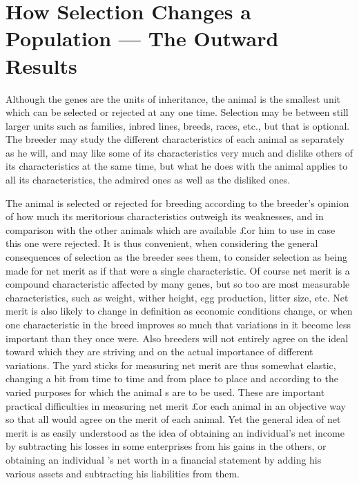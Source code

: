 \chapter[How Selection Changes a Population]{How Selection Changes a Population --- The Outward Results}
\label{cha:how-selection-changes-population-outward-results}

Although the genes are the units of inheritance, the animal is the
smallest unit which can be selected or rejected at any one time. Selection
may be between still larger units such as families, inbred lines,
breeds, races, etc., but that is optional. The breeder may study the different
characteristics of each animal as separately as he will, and may
like some of its characteristics very much and dislike others of its characteristics
at the same time, but what he does with the animal applies to
all its characteristics, the admired ones as well as the disliked ones.

The animal is selected or rejected for breeding according to the
breeder's opinion of how much its meritorious characteristics outweigh
its weaknesses, and in comparison with the other animals which are
available £or him to use in case this one were rejected. It is thus convenient,
when considering the general consequences of selection as the
breeder sees them, to consider selection as being made for net merit as if
that were a single characteristic. Of course net merit is a compound
characteristic affected by many genes, but so too are most measurable
characteristics, such as weight, wither height, egg production, litter
size, etc. Net merit is also likely to change in definition as economic
conditions change, or when one characteristic in the breed improves so
much that variations in it become less important than they once were.
Also breeders will not entirely agree on the ideal toward which they are
striving and on the actual importance of different variations. The yard sticks
for measuring net merit are thus somewhat elastic, changing a bit
from time to time and from place to place and according to the varied
purposes for which the animal s are to be used. These are important
practical difficulties in measuring net merit £or each animal in an objective
way so that all would agree on the merit of each animal. Yet the
general idea of net merit is as easily understood as the idea of obtaining
an individual's net income by subtracting his losses in some enterprises
from his gains in the others, or obtaining an individual 's net worth in a
financial statement by adding his various assets and subtracting his liabilities
from them.

